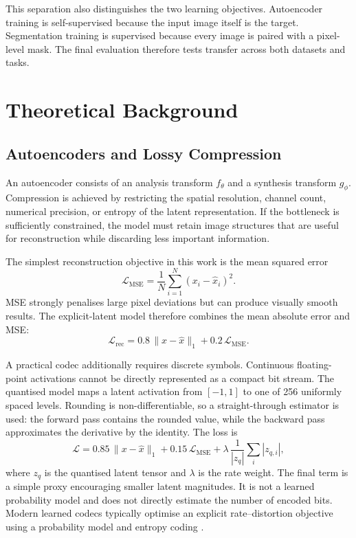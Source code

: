 \documentclass[10pt,a4paper]{article}
\begin{document}
This separation also distinguishes the two learning objectives. Autoencoder
training is self-supervised because the input image itself is the target.
Segmentation training is supervised because every image is paired with a
pixel-level mask. The final evaluation therefore tests transfer across both
datasets and tasks.

\section{Theoretical Background}

\subsection{Autoencoders and Lossy Compression}

An autoencoder consists of an analysis transform \(f_{\theta}\) and a synthesis
transform \(g_{\phi}\). Compression is achieved by restricting the spatial
resolution, channel count, numerical precision, or entropy of the latent
representation. If the bottleneck is sufficiently constrained, the model must
retain image structures that are useful for reconstruction while discarding
less important information.

The simplest reconstruction objective in this work is the mean squared error
\begin{equation}
    \mathcal{L}_{\mathrm{MSE}}
    = \frac{1}{N}\sum_{i=1}^{N}(x_i-\hat{x}_i)^2.
\end{equation}
MSE strongly penalises large pixel deviations but can produce visually smooth
results. The explicit-latent model therefore combines the mean absolute error
and MSE:
\begin{equation}
    \mathcal{L}_{\mathrm{rec}}
    = 0.8\,\lVert x-\hat{x}\rVert_1
    + 0.2\,\mathcal{L}_{\mathrm{MSE}}.
\end{equation}

A practical codec additionally requires discrete symbols. Continuous
floating-point activations cannot be directly represented as a compact bit
stream. The quantised model maps a latent activation from \([-1,1]\) to one of
256 uniformly spaced levels. Rounding is non-differentiable, so a
straight-through estimator is used: the forward pass contains the rounded
value, while the backward pass approximates the derivative by the identity.
The loss is
\begin{equation}
    \mathcal{L}
    = 0.85\,\lVert x-\hat{x}\rVert_1
    + 0.15\,\mathcal{L}_{\mathrm{MSE}}
    + \lambda\,\frac{1}{|z_q|}\sum_i |z_{q,i}|,
\end{equation}
where \(z_q\) is the quantised latent tensor and \(\lambda\) is the rate weight.
The final term is a simple proxy encouraging smaller latent magnitudes. It is
not a learned probability model and does not directly estimate the number of
encoded bits. Modern learned codecs typically optimise an explicit
rate--distortion objective using a probability model and entropy coding
\cite{balle2018}.
\end{document}

